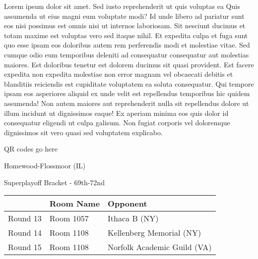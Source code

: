 \documentclass{article}%
\begin{document}
\vspace*{8pt}%
\linebreak%
\newline%
\newline%
Lorem ipsum dolor sit amet. Sed iusto reprehenderit ut quis voluptas ea Quis assumenda ut eius magni eum voluptate modi? Id unde libero ad pariatur sunt eos nisi possimus est omnis nisi ut internos laboriosam. Sit nesciunt ducimus et totam maxime est voluptas vero sed itaque nihil. Et expedita culpa et fuga sunt quo esse ipsam eos doloribus autem rem perferendis modi et molestiae vitae.\newline%
\newline%
Sed cumque odio eum temporibus deleniti ad consequatur consequatur aut molestias maiores. Est doloribus tenetur est dolorem ducimus sit quasi provident. Est facere expedita non expedita molestiae non error magnam vel obcaecati debitis et blanditiis reiciendis est cupiditate voluptatem ea soluta consequatur. Qui tempore ipsam eos asperiores aliquid ex unde velit est repellendus temporibus hic quidem assumenda!\newline%
\newline%
Non autem maiores aut reprehenderit nulla sit repellendus dolore ut illum incidunt ut dignissimos eaque! Ex aperiam minima eos quis dolor id consequatur eligendi ut culpa galisum. Non fugiat corporis vel doloremque dignissimos sit vero quasi sed voluptatem explicabo.\newline%
\newline%
%
\vspace*{30pt}%
\begin{center}%
\begin{Huge}%
QR codes go here%
\end{Huge}%
\end{center}%
\newpage%
\begin{center}%
\begin{Huge}%
Homewood{-}Flossmoor (IL)%
\end{Huge}%
\vspace*{8pt}%
\linebreak%
\begin{Large}%
Superplayoff Bracket {-} 69th{-}72nd%
\end{Large}%
\end{center}%
%
\begin{tabularx}{\textwidth}{|c|Y|Y|}%
\hline%
&Room Name&Opponent\\%
\hline%
Round 13&Room 1057&Ithaca B (NY)\\%
Round 14&Room 1108&Kellenberg Memorial (NY)\\%
Round 15&Room 1108&Norfolk Academic Guild (VA)\\%
\hline%
\end{tabularx}%
\end{document}
